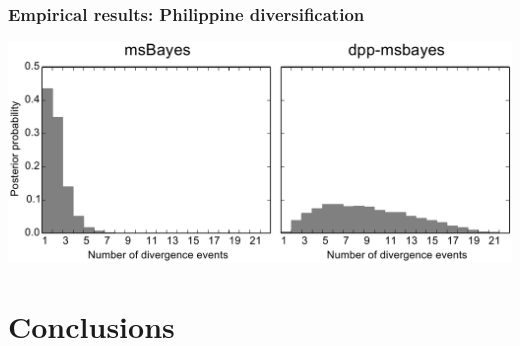 \begin{frame}
    \frametitle{Empirical results: Philippine diversification}
    \centerline{
    \includegraphics[width=\textwidth]{../../empirical-analyses/plots/philippines-dpp-psi-posterior-old-vs-dpp.pdf}}
\end{frame}

\section{Conclusions}

